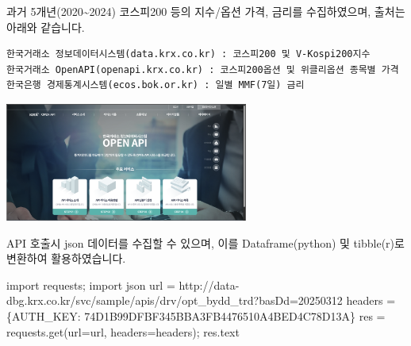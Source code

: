 \documentclass[
  a4paper,
  DIV=11,
  numbers=noendperiod]{scrreprt}
\newenvironment{Shaded}{\begin{snugshade}}{\end{snugshade}}
\newcommand{\ImportTok}[1]{\textcolor[rgb]{0.00,0.46,0.62}{#1}}
\newcommand{\NormalTok}[1]{\textcolor[rgb]{0.00,0.23,0.31}{#1}}
\newcommand{\OperatorTok}[1]{\textcolor[rgb]{0.37,0.37,0.37}{#1}}
\newcommand{\StringTok}[1]{\textcolor[rgb]{0.13,0.47,0.30}{#1}}
\begin{document}
과거 5개년(2020\textasciitilde2024) 코스피200 등의 지수/옵션 가격,
금리를 수집하였으며, 출처는 아래와 같습니다.

\begin{verbatim}
한국거래소 정보데이터시스템(data.krx.co.kr) : 코스피200 및 V-Kospi200지수
한국거래소 OpenAPI(openapi.krx.co.kr) : 코스피200옵션 및 위클리옵션 종목별 가격
한국은행 경제통계시스템(ecos.bok.or.kr) : 일별 MMF(7일) 금리
\end{verbatim}

\begin{tcolorbox}[enhanced jigsaw, bottomtitle=1mm, breakable, coltitle=black, opacityback=0, titlerule=0mm, left=2mm, colbacktitle=quarto-callout-note-color!10!white, toptitle=1mm, colframe=quarto-callout-note-color-frame, bottomrule=.15mm, opacitybacktitle=0.6, leftrule=.75mm, title=\textcolor{quarto-callout-note-color}{\faInfo}\hspace{0.5em}{한국거래소 OpenAPI를 활용한 데이터 수집 예시}, arc=.35mm, toprule=.15mm, rightrule=.15mm, colback=white]

\begin{center}
\includegraphics[width=0.6\textwidth,height=\textheight]{image/krxopenapi1.png}
\end{center}

API 호출시 json 데이터를 수집할 수 있으며, 이를 Dataframe(python) 및
tibble(r)로 변환하여 활용하였습니다.

\begin{Shaded}
\begin{Highlighting}[]
\ImportTok{import}\NormalTok{ requests}\OperatorTok{;} \ImportTok{import}\NormalTok{ json}
\NormalTok{url }\OperatorTok{=} \StringTok{\textquotesingle{}http://data{-}dbg.krx.co.kr/svc/sample/apis/drv/opt\_bydd\_trd?basDd=20250312\textquotesingle{}}
\NormalTok{headers }\OperatorTok{=}\NormalTok{ \{}\StringTok{\textquotesingle{}AUTH\_KEY\textquotesingle{}}\NormalTok{: }\StringTok{\textquotesingle{}74D1B99DFBF345BBA3FB4476510A4BED4C78D13A\textquotesingle{}}\NormalTok{\}}
\NormalTok{res }\OperatorTok{=}\NormalTok{ requests.get(url}\OperatorTok{=}\NormalTok{url, headers}\OperatorTok{=}\NormalTok{headers)}\OperatorTok{;}\NormalTok{ res.text}
\end{Highlighting}
\end{Shaded}


\end{tcolorbox}
\end{document}
